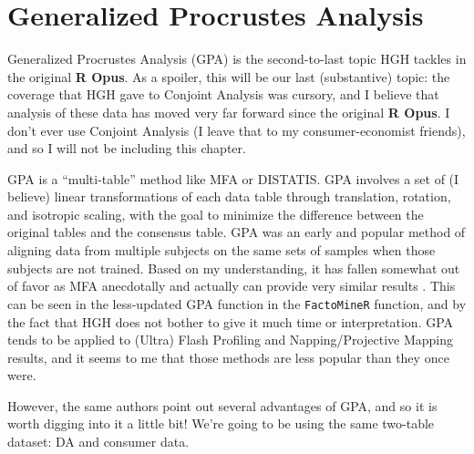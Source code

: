 \documentclass[
]{book}
\begin{document}
\chapter{Generalized Procrustes Analysis}\label{generalized-procrustes-analysis}

Generalized Procrustes Analysis (GPA) is the second-to-last topic HGH tackles in the original \textbf{R Opus}. As a spoiler, this will be our last (substantive) topic: the coverage that HGH gave to Conjoint Analysis was cursory, and I believe that analysis of these data has moved very far forward since the original \textbf{R Opus}. I don't ever use Conjoint Analysis (I leave that to my consumer-economist friends), and so I will not be including this chapter.

GPA is a ``multi-table'' method like MFA or DISTATIS. GPA involves a set of (I believe) linear transformations of each data table through translation, rotation, and isotropic scaling, with the goal to minimize the difference between the original tables and the consensus table. GPA was an early and popular method of aligning data from multiple subjects on the same sets of samples when those subjects are not trained. Based on my understanding, it has fallen somewhat out of favor as MFA anecdotally and actually can provide very similar results \citep{tomicComparison2015}. This can be seen in the less-updated GPA function in the \texttt{FactoMineR} function, and by the fact that HGH does not bother to give it much time or interpretation. GPA tends to be applied to (Ultra) Flash Profiling and Napping/Projective Mapping results, and it seems to me that those methods are less popular than they once were.

However, the same authors point out several advantages of GPA, and so it is worth digging into it a little bit! We're going to be using the same two-table dataset: DA and consumer data.
\end{document}
